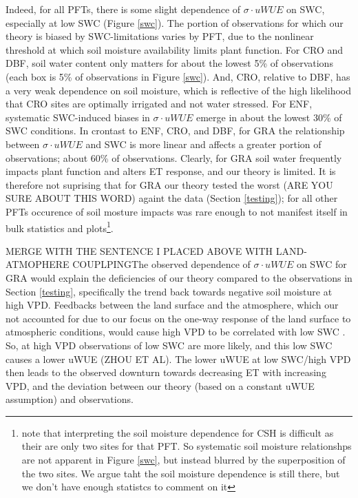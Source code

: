 \documentclass[draft,linenumbers]{agujournal}
\begin{document}
Indeed, for all PFTs, there is some slight dependence of $\sigma \cdot uWUE$ on SWC, especially at low SWC (Figure \ref{swc}). The portion of observations for which our theory is biased by SWC-limitations varies by PFT, due to the nonlinear threshold at which soil moisture availability limits plant function. For CRO and DBF, soil water content only matters for about the lowest 5\% of observations (each box is 5\% of observations in Figure \ref{swc}). And, CRO, relative to DBF, has a very weak dependence on soil moisture, which is reflective of the high likelihood that CRO sites are optimally irrigated and not water stressed. For ENF, systematic SWC-induced biases in $\sigma \cdot uWUE$ emerge in about the lowest 30\% of SWC conditions. In crontast to ENF, CRO, and DBF, for GRA the relationship between $\sigma \cdot uWUE$ and SWC is more linear and affects a greater portion of observations; about 60\% of observations. Clearly, for GRA soil water frequently impacts plant function and alters ET response, and our theory is limited. It is therefore not suprising that for GRA our theory tested the worst (ARE YOU SURE ABOUT THIS WORD) againt the data (Section \ref{testing}); for all other PFTs occurence of soil mosture impacts was rare enough to not manifest itself in bulk statistics and plots\footnote{note that interpreting the soil moisture dependence for CSH is difficult as their are only two sites for that PFT. So systematic soil moisture relationshps are not apparent in Figure \ref{swc}, but instead blurred by the superposition of the two sites. We argue taht the soil moisture dependence is still there, but we don't have enough statistcs to comment on it}.

MERGE WITH THE SENTENCE I PLACED ABOVE WITH LAND-ATMOPHERE COUPLPINGThe observed dependence of $\sigma \cdot uWUE$ on SWC for GRA would explain the deficiencies of our theory compared to the observations in Section \ref{testing}, specifically the trend back towards negative soil moisture at high VPD. Feedbacks between the land surface and the atmosphere, which our not accounted for due to our focus on the one-way response of the land surface to atmospheric conditions, would cause high VPD to be correlated with low SWC \citep[][Gentine et al. GRL 2016]{Berg_2016}. So, at high VPD observations of low SWC are more likely, and this low SWC causes a lower uWUE (ZHOU ET AL). The lower uWUE at low SWC/high VPD then leads to the observed downturn towards decreasing ET with increasing VPD, and the deviation between our theory (based on a constant uWUE assumption) and observations.
\end{document}
